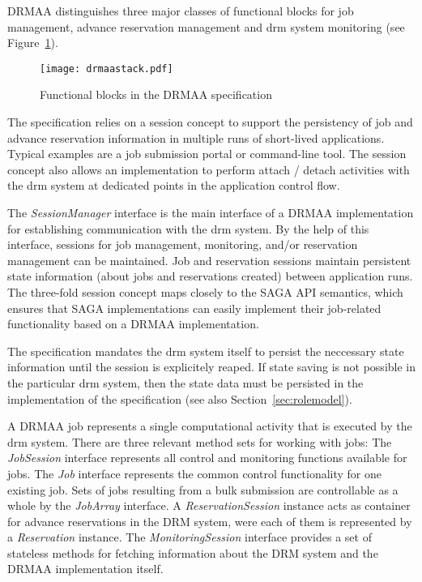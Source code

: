 \documentclass[twocolumn]{svjour3}       %
\begin{document}
DRMAA distinguishes three major classes of functional blocks for job management, advance reservation management and \gls{drm} system monitoring (see Figure~\ref{fig:drmaastack}).

\begin{figure}
  \texttt{[image: drmaastack.pdf]}
\caption{Functional blocks in the DRMAA specification}
\label{fig:drmaastack} 
\end{figure}

The specification relies on a session concept to support the persistency of job and advance reservation information in multiple runs of short-lived applications. Typical examples are a job submission portal or command-line tool. The session concept also allows an implementation to perform attach / detach activities with the \gls{drm} system at dedicated points in the application control flow.

The \emph{SessionManager} interface is the main interface of a DRMAA implementation for establishing communication with the \gls{drm} system. By the help of this interface, sessions for job management, monitoring, and/or reservation management can be maintained. Job and reservation sessions maintain persistent state information (about jobs and reservations created) between application runs. The three-fold session concept maps closely to the SAGA API semantics, which ensures that SAGA implementations can easily implement their job-related functionality based on a DRMAA implementation.

The specification mandates the \gls{drm} system itself to persist the neccessary state information until the session is explicitely reaped. If state saving is not possible in the particular \gls{drm} system, then the state data must be persisted in the implementation of the specification (see also Section~\ref{sec:rolemodel}). 

A DRMAA job represents a single computational activity that is executed by the \gls{drm} system. There are three relevant method sets for working with jobs: The \emph{JobSession} interface represents all control and monitoring functions available for jobs. The \emph{Job} interface represents the common control functionality for one existing job. Sets of jobs resulting from a bulk submission are controllable as a whole by the \emph{JobArray} interface. A \emph{ReservationSession} instance acts as container for advance reservations in the DRM system, were each of them is represented by a \emph{Reservation} instance. The \emph{MonitoringSession} interface provides a set of stateless methods for fetching information about the DRM system and the DRMAA implementation itself.
\end{document}
